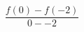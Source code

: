 \documentclass[preview]{standalone}
\begin{document}
\begin{align*}
\dfrac{f(0) - f(-2)}{0 - -2}
\end{align*}
\end{document}
